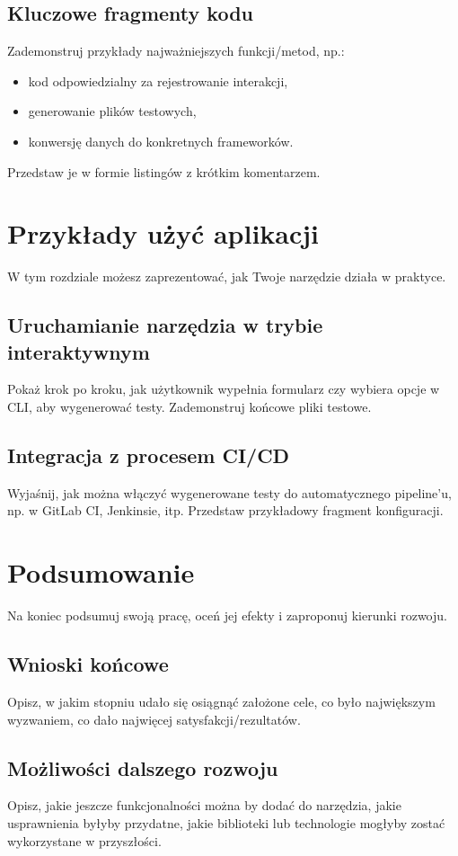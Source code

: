 \documentclass[12pt]{report}
\begin{document}
\section{Kluczowe fragmenty kodu}
{Zademonstruj przykłady najważniejszych funkcji/metod, np.:
\begin{itemize}
    \item kod odpowiedzialny za rejestrowanie interakcji,
    \item generowanie plików testowych,
    \item konwersję danych do konkretnych frameworków.
\end{itemize}
Przedstaw je w formie listingów z krótkim komentarzem.}

\chapter{Przykłady użyć aplikacji}
{W tym rozdziale możesz zaprezentować, jak Twoje narzędzie działa w praktyce.}

\section{Uruchamianie narzędzia w trybie interaktywnym}
{Pokaż krok po kroku, jak użytkownik wypełnia formularz czy wybiera opcje w CLI, aby wygenerować testy. Zademonstruj końcowe pliki testowe.}

\section{Integracja z procesem CI/CD}
{Wyjaśnij, jak można włączyć wygenerowane testy do automatycznego pipeline’u, np. w GitLab CI, Jenkinsie, itp. Przedstaw przykładowy fragment konfiguracji.}

\chapter{Podsumowanie}
{Na koniec podsumuj swoją pracę, oceń jej efekty i zaproponuj kierunki rozwoju.}

\section{Wnioski końcowe}
{Opisz, w jakim stopniu udało się osiągnąć założone cele, co było największym wyzwaniem, co dało najwięcej satysfakcji/rezultatów.}

\section{Możliwości dalszego rozwoju}
{Opisz, jakie jeszcze funkcjonalności można by dodać do narzędzia, jakie usprawnienia byłyby przydatne, jakie biblioteki lub technologie mogłyby zostać wykorzystane w przyszłości.}
\end{document}
